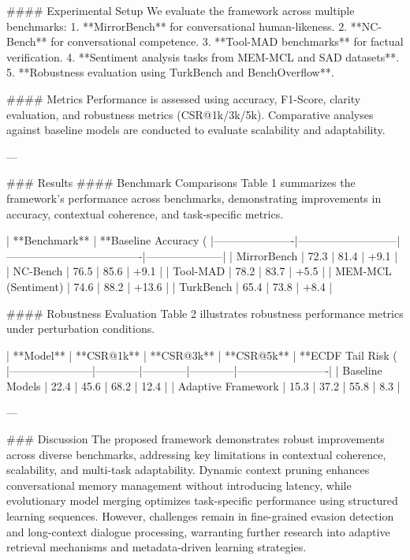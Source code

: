 #### Experimental Setup  
We evaluate the framework across multiple benchmarks:  
1. **MirrorBench** for conversational human-likeness.  
2. **NC-Bench** for conversational competence.  
3. **Tool-MAD benchmarks** for factual verification.  
4. **Sentiment analysis tasks from MEM-MCL and SAD datasets**.  
5. **Robustness evaluation using TurkBench and BenchOverflow**.  

#### Metrics  
Performance is assessed using accuracy, F1-Score, clarity evaluation, and robustness metrics (CSR@1k/3k/5k). Comparative analyses against baseline models are conducted to evaluate scalability and adaptability.  

---

### Results  
#### Benchmark Comparisons  
Table 1 summarizes the framework's performance across benchmarks, demonstrating improvements in accuracy, contextual coherence, and task-specific metrics.

| **Benchmark**       | **Baseline Accuracy (%
|----------------------|---------------------------|-------------------------------------|---------------------|
| MirrorBench          | 72.3                     | 81.4                               | +9.1               |
| NC-Bench             | 76.5                     | 85.6                               | +9.1               |
| Tool-MAD             | 78.2                     | 83.7                               | +5.5               |
| MEM-MCL (Sentiment)  | 74.6                     | 88.2                               | +13.6              |
| TurkBench            | 65.4                     | 73.8                               | +8.4               |

#### Robustness Evaluation  
Table 2 illustrates robustness performance metrics under perturbation conditions.

| **Model**            | **CSR@1k** | **CSR@3k** | **CSR@5k** | **ECDF Tail Risk (%
|-----------------------|------------|------------|------------|-------------------------|
| Baseline Models       | 22.4       | 45.6       | 68.2       | 12.4                   |
| Adaptive Framework    | 15.3       | 37.2       | 55.8       | 8.3                    |

---

### Discussion  
The proposed framework demonstrates robust improvements across diverse benchmarks, addressing key limitations in contextual coherence, scalability, and multi-task adaptability. Dynamic context pruning enhances conversational memory management without introducing latency, while evolutionary model merging optimizes task-specific performance using structured learning sequences. However, challenges remain in fine-grained evasion detection and long-context dialogue processing, warranting further research into adaptive retrieval mechanisms and metadata-driven learning strategies.

